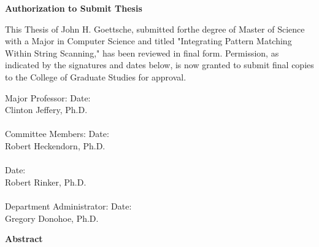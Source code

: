 \documentclass{article}
\begin{document}
\pagebreak
\large
\thispagestyle{fancy}
\begin{center}
\textbf{Authorization to Submit Thesis}
\end{center}
This Thesis of John H. Goettsche, submitted forthe degree of Master of Science with a Major in Computer Science and titled "Integrating Pattern Matching Within String Scanning," has been reviewed in final form.  Permission, as indicated by the signatures and dates below, is now granted to submit final copies to the College of Graduate Studies for approval.\\
\vspace{0.3in}
\begin{singlespace}
\noindent
	Major Professor:\hspace{0.8in}\makebox[2.5in]{\hrulefill} Date: \makebox[1.0in]{\hrulefill} \\
	\-\hspace{2.0in}Clinton Jeffery, Ph.D.\\
	\vspace{0.1in}\\
	Committee Members:\hspace{0.5in}\makebox[2.5in]{\hrulefill} Date: \makebox[1.0in]{\hrulefill} \\
	\-\hspace{2.0in}Robert Heckendorn, Ph.D.\\
	\vspace{0.1in}\\
	\-\hspace{2.0in}\makebox[2.5in]{\hrulefill} Date: \makebox[1.0in]{\hrulefill} \\
	\-\hspace{2.0in}Robert Rinker, Ph.D.\\
	\vspace{0.1in}\\
	Department Administrator: \makebox[2.5in]{\hrulefill} Date: \makebox[1.0in]{\hrulefill} \\
	\-\hspace{2.0in}Gregory Donohoe, Ph.D.\\
\end{singlespace}

\pagebreak

\begin{center}
\textbf{Abstract}
\end{center}
\end{document}
